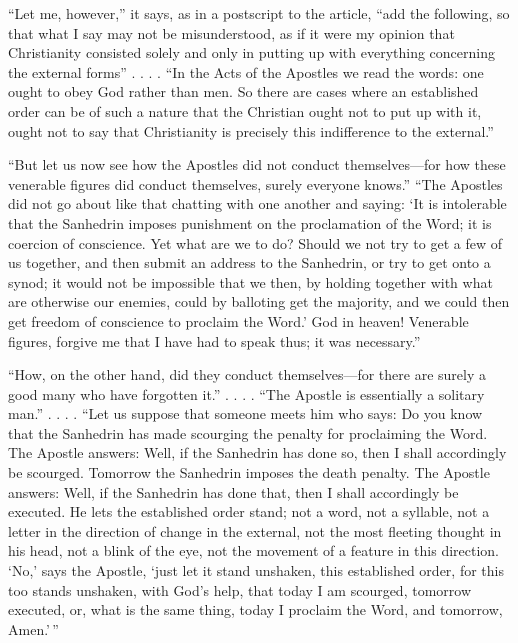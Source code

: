\documentclass[12pt,a4paper]{article}
\newcommand{\opage}[1]{\marginnote{\footnotesize\textit{[#1]}}}
\begin{document}
``Let me, however,'' it says, as in a postscript to
the article, ``add the following, so that what I say may not
be misunderstood, as if it were my opinion that
Christianity consisted solely and only in putting up with everything
\opage{23}concerning the external forms'' . . . . ``In the Acts of the
Apostles we read the words: one ought to obey God rather than
men. So there are cases where an established order
can be of such a nature that the Christian ought not to
put up with it, ought not to say that Christianity is precisely
this indifference to the external.''

``But let us now see how the Apostles did not conduct
themselves---for how these venerable figures did conduct
themselves, surely everyone knows.'' ``The Apostles did not go about
like that chatting with one another and saying: `It is
intolerable that the Sanhedrin imposes punishment on the proclamation
of the Word; it is coercion of conscience. Yet what are
we to do? Should we not try to get a few of us together, and
then submit an address to the Sanhedrin, or try to get
onto a synod; it would not be impossible that we then,
by holding together with what are otherwise our enemies,
could by balloting get the majority, and we could then
get freedom of conscience to proclaim the Word.' God in
heaven! Venerable figures, forgive me that I have had
to speak thus; it was necessary.''

``How, on the other hand, did they conduct themselves---for there are
surely a good many who have forgotten it.'' . . . . ``The Apostle
is essentially a solitary man.'' . . . . ``Let us suppose
that someone meets him who says: Do you know that the Sanhedrin
has made scourging the penalty for proclaiming the Word. The Apostle
answers: Well, if the Sanhedrin has done so, then I shall accordingly
be scourged. Tomorrow the Sanhedrin imposes the death penalty.
The Apostle answers: Well, if the Sanhedrin has done that, then I shall
accordingly be executed. He lets the established order
stand; not a word, not a syllable, not a letter
in the direction of change in the external, not the most fleeting
thought in his head, not a blink of the eye, not the
movement of a feature in this direction.
`No,' says the Apostle,
`just let it stand unshaken, this established order, for
this too stands unshaken, with God's help, that today
I am scourged, tomorrow executed, or, what
\opage{24}is the same thing, today I proclaim the Word, and tomorrow,
Amen.'\,''
\end{document}
